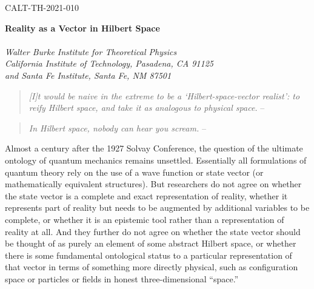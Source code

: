 \documentclass[12pt,english]{article}
\begin{document}
\hfill CALT-TH-2021-010
\hfill

\thispagestyle{empty}
\medskip

\begin{center}
{\large\bf
Reality as a Vector in Hilbert Space
}\\
 \\[7mm]
 {\it Walter Burke Institute for Theoretical Physics\\
    California Institute of Technology,
   Pasadena, CA 91125\\
   and Santa Fe Institute, Santa Fe, NM 87501} \\
\end{center}

\begin{abstract}
I defend the extremist position that the fundamental ontology of the world consists of a vector in Hilbert space evolving according to the Schr\"odinger equation.
The laws of physics are determined solely by the energy eigenspectrum of the Hamiltonian.
The structure of our observed world, including space and fields living within it, should arise as a higher-level emergent description.
I sketch how this might come about, although much work remains to be done.

Invited contribution to the volume \emph{Quantum Mechanics and Fundamentality: Naturalizing Quantum Theory Between Scientific Realism and Ontological Indeterminacy}; Valia Allori (ed.).
\end{abstract}



\newpage
	
\setcounter{footnote}{0}

\begin{quote}
\emph{[I]t would be naive in the extreme to be a `Hilbert-space-vector realist': to reify Hilbert space, and take it as analogous to physical space.} 
-- \citet{wallace2017}
\end{quote}

\begin{quote}
\emph{In Hilbert space, nobody can hear you scream.} -- \citet{aharonov2005quantum}
\end{quote}


Almost a century after the 1927 Solvay Conference, the question of the ultimate ontology of quantum mechanics remains unsettled.
Essentially all formulations of quantum theory rely on the use of a wave function or state vector (or mathematically equivalent structures).
But researchers do not agree on whether the state vector is a complete and exact representation of reality, whether it represents part of reality but needs to be augmented by additional variables to be complete, or whether it is an epistemic tool rather than a representation of reality at all.
And they further do not agree on whether the state vector should be thought of as purely an element of some abstract Hilbert space, or whether there is some fundamental ontological status to a particular representation of that vector in terms of something more directly physical, such as configuration space or particles or fields in honest three-dimensional ``space.''
\end{document}
